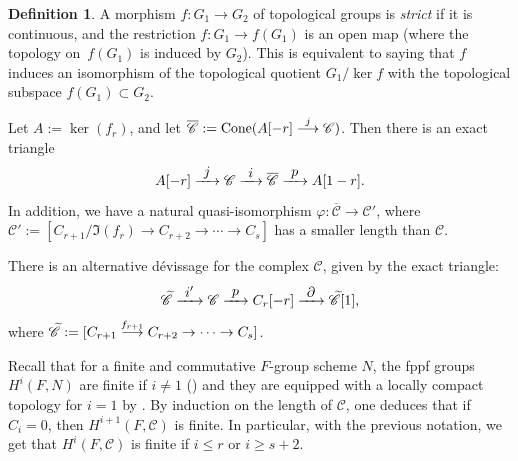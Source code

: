 \documentclass[JEP,XML,SOM,Unicode, NoEqCountersInSection]{cedram}
\let\mathcal\mathscr
\newcommand\To[1]{\mathchoice{\xrightarrow{\textstyle\kern4pt#1\kern3pt}}{\stackrel{#1}{\longrightarrow}}{}{}}
\theoremstyle{plain}
\theoremstyle{definition}
\newtheorem{defi}[theo]{Definition}
\newcommand \cC {\mathcal{C}}
\begin{document}
\begin{defi}
A morphism $f: G_1 \to G_2$
of topological groups is \emph{strict} if it is continuous, and
the restriction $f: G_1 \to f(G_1)$ is
an open map (where the topology on~$f(G_1)$ is induced by $G_2$). This is
equivalent to saying that $f$ induces an isomorphism of the topological
quotient $G_1/\ker f$ with the topological subspace $f(G_1) \subset G_2$.
\end{defi}

Let $A:= \ker(f_r)$, and let $\overline{\cC}:= \textup{Cone}(A[-r] \To{j} \cC)$. Then there is an exact triangle%
\begin{equation} \label{devissage complexe}
A[-r] \To{j} \cC \To{i} \overline{\cC} \To{p} A[1-r].
\end{equation}
In addition, we have a natural quasi-isomorphism $\varphi: \overline{\cC} \to \cC'$, where $\cC':= [C_{r+1}/\Im (f_r) \to C_{r+2} \to \cdots\to C_s]$ has a smaller length than $\cC$.

There is an alternative dévissage for the complex $\cC$, given by
the exact triangle:
\begin{equation} \label{devissage complexe bis}
\widetilde{\cC} \To{i'} \cC \To{p} C_r[-r] \To{\partial} \widetilde{\cC}[1],
\end{equation}
where $\widetilde{\cC}:= [C_{r+1} \To{f_{r+1}} C_{r+2} \to \cdots\to C_s]$.

Recall that for a finite and commutative $F$-group scheme $N$, the fppf groups
$H^i(F,N)$ are finite if $i \neq 1$ (\cite[\S III.6]{MilADT}) and they are
equipped with a locally compact topology for $i=1$ by \cite{Ces}.
By induction on the length of $\cC$, one deduces that if $C_i = 0$, then $H^{i+1}(F, \cC)$ is finite. In particular, with the previous notation, we get that $H^i(F, \cC)$ is finite if $i \leq r$ or $i \geq s+2$.
\end{document}
